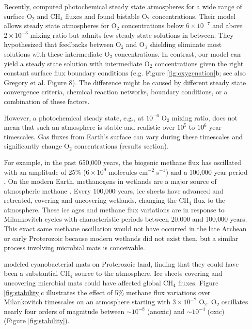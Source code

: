 Recently, \citet{Bethan_2021} computed photochemical steady state atmospheres for a wide range of surface O$_2$ and CH$_4$ fluxes and found bistable O$_2$ concentrations. Their model allows steady state atmospheres for O$_2$ concentrations below $6 \times 10^{-7}$ and above $2 \times 10^{-3}$ mixing ratio but admits few steady state solutions in between. They hypothesized that feedbacks between O$_2$ and O$_3$ shielding eliminate most solutions with these intermediate O$_2$ concentrations. In contrast, our model can yield a steady state solution with intermediate O$_2$ concentrations given the right constant surface flux boundary conditions (e.g. Figure \ref{fig:oxygenation}b; see also Gregory et al. Figure 8). The difference might be caused by different steady state convergence criteria, chemical reaction networks, boundary conditions, or a combination of these factors. 

However, a photochemical steady state, e.g., at $10^{-6}$ O$_2$ mixing ratio, does not mean that such an atmosphere is stable and realistic over $10^5$ to $10^6$ year timescales. Gas fluxes from Earth's surface can vary during these timescales and significantly change O$_2$ concentrations (results section). 

For example, in the past 650,000 years, the biogenic methane flux has oscillated with an amplitude of 25\% ($6 \times 10^9$ molecules cm$^{-2}$ s$^{-1}$) and a 100,000 year period \citep{Hopcroft_2018,Spahni_2005}. On the modern Earth, methanogens in wetlands are a major source of atmospheric methane \citep{Canadell_2021}. Every 100,000 years, ice sheets have advanced and retreated, covering and uncovering wetlands, changing the CH$_4$ flux to the atmosphere. These ice ages and methane flux variations are in response to Milankovitch cycles with characteristic periods between 20,000 and 100,000 years. This exact same methane oscillation would not have occurred in the late Archean or early Proterozoic because modern wetlands did not exist then, but a similar process involving microbial mats is conceivable. 

\citet{Zhao_2018} modeled cyanobacterial mats on Proterozoic land, finding that they could have been a substantial CH$_4$ source to the atmosphere. Ice sheets covering and uncovering microbial mats could have affected global CH$_4$ fluxes. Figure \ref{fig:stability}c illustrates the effect of 5\% methane flux variations over Milankovitch timescales on an atmosphere starting with $3\times 10^{-7}$ O$_2$. O$_2$ oscillates nearly four orders of magnitude between $\sim10^{-8}$ (anoxic) and $\sim10^{-4}$ (oxic) (Figure \ref{fig:stability}).

